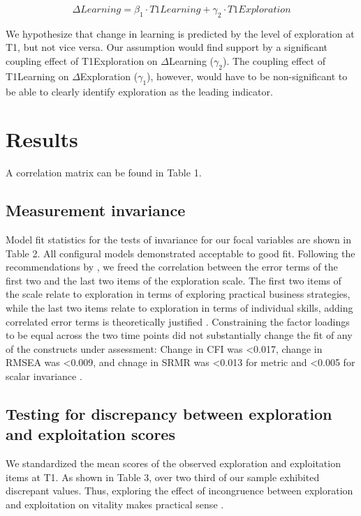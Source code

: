 \documentclass[man, 12pt, a4paper, noextraspace]{apa6}
\begin{document}
\[\Delta Learning=\beta_1 \cdot T1Learning + \gamma_2 \cdot T1Exploration\]

We hypothesize that change in learning is predicted by the level of exploration at T1, but not vice versa. 
Our assumption would find support by a significant coupling effect of T1Exploration on $\Delta$Learning ($\gamma_2$). 
The coupling effect of T1Learning on $\Delta$Exploration ($\gamma_1$), however, would have to be non-significant to be able to clearly identify exploration as the leading indicator. 

\section{Results}

A correlation matrix can be found in Table 1. 

\subsection{Measurement invariance}

Model fit statistics for the tests of invariance for our focal variables are shown in Table 2. 
All configural models demonstrated acceptable to good fit.
Following the recommendations by \textcite{Brown2015}, we freed the correlation between the error terms of the first two and the last two items of the exploration scale. 
The first two items of the scale relate to exploration in terms of exploring practical business strategies, while the last two items relate to exploration in terms of individual skills, adding correlated error terms is theoretically justified \parencite[e.g.,][]{Brown2015, Little.2013}. 
Constraining the factor loadings to be equal across the two time points did not substantially change the fit of any of the constructs under assessment: Change in CFI was <0.017, change in RMSEA was <0.009, and chnage in SRMR was <0.013 for metric and <0.005 for scalar invariance \parencite{Chen2007, Cheung2002}.

\subsection{Testing for discrepancy between exploration and exploitation scores}
We standardized the mean scores of the observed exploration and exploitation items at T1. 
As shown in Table 3, over two third of our sample exhibited discrepant values. 
Thus, exploring the effect of incongruence between exploration and exploitation on vitality makes practical sense \parencite{Shanock.2010b}.
\end{document}
